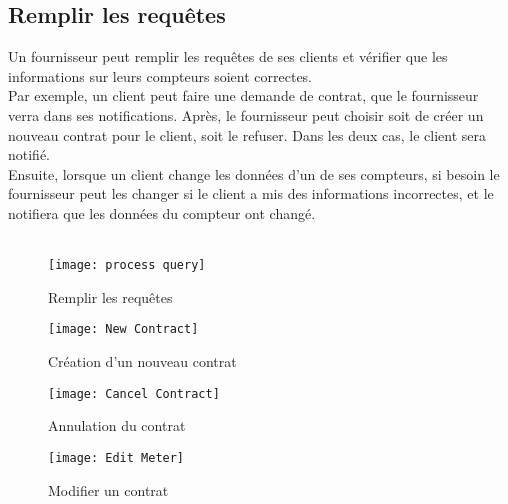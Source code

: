 \documentclass{report}
\begin{document}
\subsection{Remplir les requêtes}

Un fournisseur peut remplir les requêtes de ses clients et vérifier que les informations sur leurs compteurs soient correctes. \\
Par exemple, un client peut faire une demande de contrat, que le fournisseur verra dans ses notifications. Après, le fournisseur peut choisir soit de créer un nouveau contrat pour le client, soit le refuser. Dans les deux cas, le client sera notifié. \\
Ensuite, lorsque un client change les données d'un de ses compteurs, si besoin le fournisseur peut les changer si le client a mis des informations incorrectes, et le notifiera que les données du compteur ont changé.
\\
\\
\begin{figure}[h]
    \centering
    \texttt{[image: process query]}
    \caption{Remplir les requêtes}
    \label{fig:processQuery}
\end{figure}

\begin{figure}[h]
	\centering
	\texttt{[image: New Contract]}
	\caption{Création d'un nouveau contrat}
	\label{fig:newContract}
\end{figure}

\begin{figure}[h]
	\centering
	\texttt{[image: Cancel Contract]}
	\caption{Annulation du contrat}
	\label{fig:cancelContract}
\end{figure}

\begin{figure}[h]
	\centering
	\texttt{[image: Edit Meter]}
	\caption{Modifier un contrat}
	\label{fig:cancelContract}
\end{figure}
\end{document}
